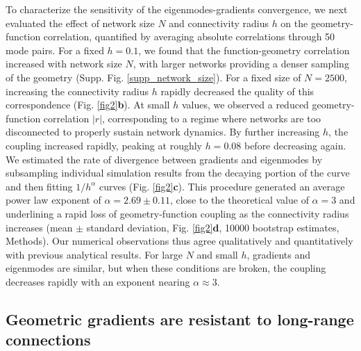 \documentclass{article}
\begin{document}
To characterize the sensitivity of the eigenmodes-gradients convergence, we next evaluated the effect of network size $N$ and connectivity radius $h$ on the geometry-function correlation, quantified by averaging absolute correlations through 50 mode pairs. For a fixed $h=0.1$, we found that the function-geometry correlation increased with network size $N$, with larger networks providing a denser sampling of the geometry (Supp. Fig. \ref{supp_network_size}). For a fixed size of $N=2500$, increasing the connectivity radius $h$ rapidly decreased the quality of this correspondence (Fig. \ref{fig2}\textbf{b}). At small $h$ values, we observed a reduced geometry-function correlation $|r|$, corresponding to a regime where networks are too disconnected to properly sustain network dynamics. By further increasing $h$, the coupling increased rapidly, peaking at roughly $h=0.08$ before decreasing again. We estimated the rate of divergence between gradients and eigenmodes by subsampling individual simulation results from the decaying portion of the curve and then fitting $1/h^\alpha$ curves (Fig. \ref{fig2}\textbf{c}). This procedure generated an average power law exponent of $\alpha=2.69\pm0.11$, close to the theoretical value of $\alpha=3$ and underlining a rapid loss of geometry-function coupling as the connectivity radius increases (mean $\pm$ standard deviation, Fig. \ref{fig2}\textbf{d}, 10000 bootstrap estimates, Methods). Our numerical observations thus agree qualitatively and quantitatively with previous analytical results\cite{GarcaTrillos2019}. For large $N$ and small $h$, gradients and eigenmodes are similar, but when these conditions are broken, the coupling decreases rapidly with an exponent nearing $\alpha\approx3$.

\subsection*{Geometric gradients are resistant to long-range connections}
\end{document}
